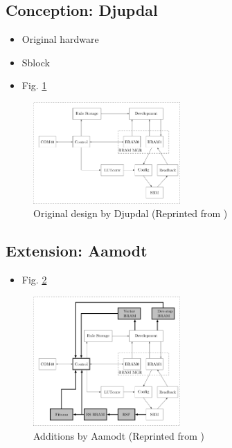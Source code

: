\subsection{Conception: Djupdal \cite{djupdal2003sblock}}

\begin{itemize}
    \item Original hardware
    \item Sblock
    \item Fig. \ref{fig:ca-djupdal}
\end{itemize}

\begin{figure}[!ht]
    \centering
    \includegraphics[width=0.5\textwidth]{figures/ca-djupdal}
    \caption{Original design by Djupdal (Reprinted from \cite{stovneng2014sblock})}
    \label{fig:ca-djupdal}
\end{figure}

\subsection{Extension: Aamodt \cite{aamodt2005sblock}}

\begin{itemize}
    \item Fig. \ref{fig:ca-aamodt}
\end{itemize}

\begin{figure}[!ht]
    \centering
    \includegraphics[width=0.5\textwidth]{figures/ca-aamodt}
    \caption{Additions by Aamodt (Reprinted from \cite{stovneng2014sblock})}
    \label{fig:ca-aamodt}
\end{figure}

